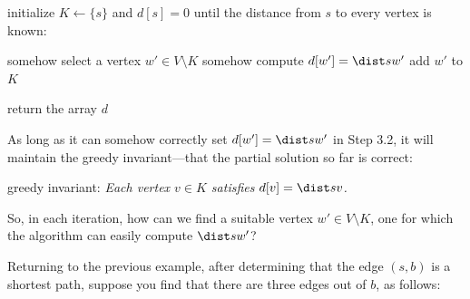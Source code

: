 \newcommand{\Dijkstra}{{\sf Dijkstra}\xspace}

\begin{samepage}
  \begin{myframed}
    \begin{steps}
    \item[\textsf{greedyShortestPaths}$\big(G=(V,E), s\big)$:]
      \step initialize $K \leftarrow \{s\}$ and $d[s] = 0$
      \step until the distance from $s$ to every vertex is known:
      \begin{block}
        \step somehow select a vertex $w' \in V\setminus K$
        \step somehow compute $d[w'] = \dist s {w'}$
        \step add $w'$ to $K$
      \end{block}
      \step return the array $d$
    \end{steps}
  \end{myframed}
\end{samepage}

As long as it can somehow correctly set $d[w'] = \dist s {w'}$ in Step 3.2,
it will maintain the greedy invariant---that the partial solution so far is correct:

\smallskip

\centerline{{\sf greedy invariant:}
  \emph{Each vertex $v\in K$ satisfies $d[v] = \dist s v$.}}

\medskip
So, in each iteration, how can we find a suitable vertex $w' \in V\setminus K$,
one for which the algorithm can easily compute $\dist s {w'}$?

Returning to the previous example,
after determining that the edge $(s, b)$ is a shortest path,
suppose you find that there are three edges out of $b$, as follows:


